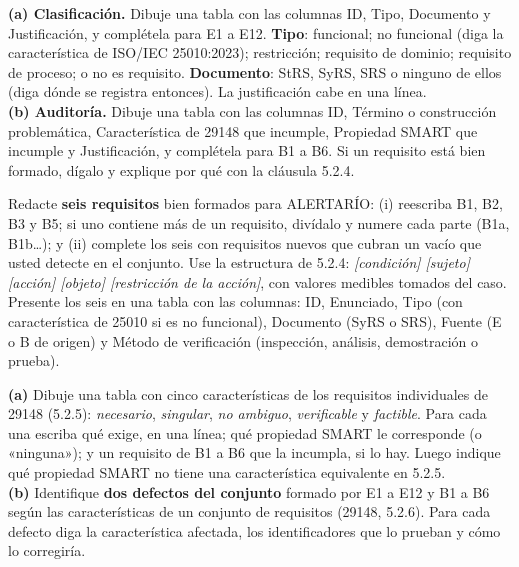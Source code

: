 \documentclass[11pt]{article}
\begin{document}
	\begin{cajatarea}[title={T2. Clasificación y auditoría \hfill D2 · 30\,\%}]
		\textbf{(a) Clasificación.} Dibuje una tabla con las columnas ID, Tipo, Documento y Justificación, y complétela para E1 a E12. \textbf{Tipo}: funcional; no funcional (diga la característica de ISO/IEC 25010:2023); restricción; requisito de dominio; requisito de proceso; o no es requisito. \textbf{Documento}: StRS, SyRS, SRS o ninguno de ellos (diga dónde se registra entonces). La justificación cabe en una línea.\\[4pt]
		\textbf{(b) Auditoría.} Dibuje una tabla con las columnas ID, Término o construcción problemática, Característica de 29148 que incumple, Propiedad SMART que incumple y Justificación, y complétela para B1 a B6. Si un requisito está bien formado, dígalo y explique por qué con la cláusula 5.2.4.
	\end{cajatarea}
	
	\begin{cajatarea}[title={T3. Redacción de requisitos bien formados \hfill D3 · 30\,\%}]
		Redacte \textbf{seis requisitos} bien formados para ALERTARÍO: (i) reescriba B1, B2, B3 y B5; si uno contiene más de un requisito, divídalo y numere cada parte (B1a, B1b\ldots); y (ii) complete los seis con requisitos nuevos que cubran un vacío que usted detecte en el conjunto. Use la estructura de 5.2.4: \emph{[condición] [sujeto] [acción] [objeto] [restricción de la acción]}, con valores medibles tomados del caso.\\[4pt]
		Presente los seis en una tabla con las columnas: ID, Enunciado, Tipo (con característica de 25010 si es no funcional), Documento (SyRS o SRS), Fuente (E o B de origen) y Método de verificación (inspección, análisis, demostración o prueba).
	\end{cajatarea}
	
	\begin{cajatarea}[title={T4. Sustento normativo de la calidad \hfill D4 · 20\,\% (junto con las citas de T1 a T3)}]
		\textbf{(a)} Dibuje una tabla con cinco características de los requisitos individuales de 29148 (5.2.5): \emph{necesario}, \emph{singular}, \emph{no ambiguo}, \emph{verificable} y \emph{factible}. Para cada una escriba qué exige, en una línea; qué propiedad SMART le corresponde (o «ninguna»); y un requisito de B1 a B6 que la incumpla, si lo hay. Luego indique qué propiedad SMART no tiene una característica equivalente en 5.2.5.\\[4pt]
		\textbf{(b)} Identifique \textbf{dos defectos del conjunto} formado por E1 a E12 y B1 a B6 según las características de un conjunto de requisitos (29148, 5.2.6). Para cada defecto diga la característica afectada, los identificadores que lo prueban y cómo lo corregiría.
	\end{cajatarea}
	
\end{document}
